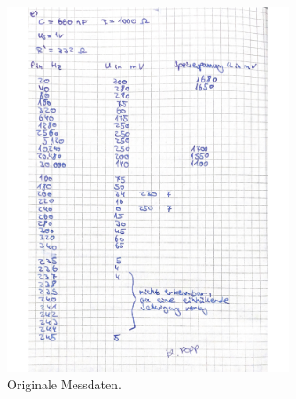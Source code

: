 \begin{figure}
  \centering
  \includegraphics[width=0.75\textwidth]{dateien/daten2.jpg}
  \caption{Originale Messdaten.}
  \label{fig:daten2}
\end{figure}